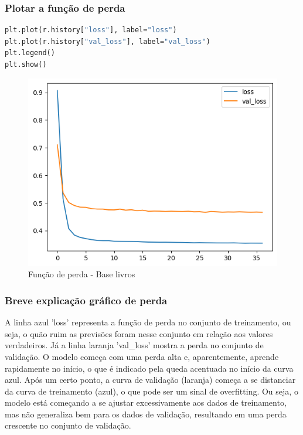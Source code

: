 \subsubsection*{Plotar a função de perda}
\begin{lstlisting}[language=Python, style=input]
plt.plot(r.history["loss"], label="loss")
plt.plot(r.history["val_loss"], label="val_loss")
plt.legend()
plt.show()
\end{lstlisting}
\begin{figure}[H]
\centering
\includegraphics[width=.8\linewidth]{apendices/fig/13_IAA012_9.png}
\caption{Função de perda - Base livros}
\end{figure}
\subsubsection*{Breve explicação gráfico de perda}
A linha azul 'loss' representa a função de perda no conjunto de treinamento, ou seja, o quão ruim as previsões foram nesse conjunto em relação aos valores verdadeiros. Já a linha laranja 'val\_loss' mostra a perda no conjunto de validação. O modelo começa com uma perda alta e, aparentemente, aprende rapidamente no início, o que é indicado pela queda acentuada no início da curva azul. Após um certo ponto, a curva de validação (laranja) começa a se distanciar da curva de treinamento (azul), o que pode ser um sinal de overfitting. Ou seja, o modelo está começando a se ajustar excessivamente aos dados de treinamento, mas não generaliza bem para os dados de validação, resultando em uma perda crescente no conjunto de validação.
